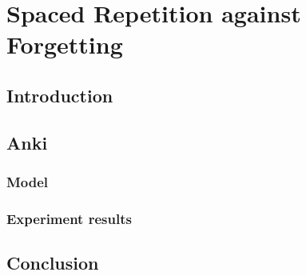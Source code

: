 \chapter{Spaced Repetition against Forgetting}
\label{chapter:spacedrepet}

{}


\section{Introduction}

\section{Anki}

\subsection{Model}

\subsection{Experiment results}

\section{Conclusion}

